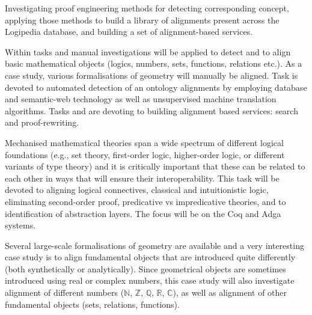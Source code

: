 \begin{workpackage}[id=alignment,type=RTD,wphases=1-48,
  short={Proof engineering},%
  title={Proof engineering},
  activity=jra,
  lead=Bel,
  LeeRM=12,  %
  StrRM=18,  %
  BelRM=20,  %
  ImtRM=6,  %
  InnRM=6,  %
  SacRM=6,  %
  FauRM=11, %
  BolRM=13, %
  InrRM=6   %
  ]

  \begin{wpobjectives}
    Investigating proof engineering
    methods for detecting corresponding concept, applying those methods
    to build a library of alignments present across the Logipedia
    database, and building a set of alignment-based services.
  \end{wpobjectives}

  \begin{wpdescription}
    Within tasks  and
     manual investigations will be
    applied to detect and to align basic mathematical objects (logics,
    numbers, sets, functions, relations etc.). As a case study,
    various formalisations of geometry will manually be aligned. Task
     is devoted to automated detection of
    an ontology alignments by employing database and semantic-web
    technology as well as unsupervised machine translation algorithms.
    Tasks  and 
    are devoting to building alignment based services: search and
    proof-rewriting.
  \end{wpdescription}

\begin{tasklist}
  \begin{task}[id=alignlogic,title=Logical foundations,shorttitle=Found.,lead=Lee,LeeRM=12,wphases=6-24!.67]
    Mechanised mathematical theories span a wide spectrum of different
    logical foundations (e.g., set theory, first-order logic,
    higher-order logic, or different variants of type theory) and it
    is critically important that these can be related to each other in
    ways that will ensure their interoperability. This task will be
    devoted to aligning logical connectives, classical and
    intuitionistic logic, eliminating second-order proof, predicative
    vs impredicative theories, and to identification of abstraction
    layers. The focus will be on the Coq and Adga systems.
  \end{task}
  
  \begin{task}[id=aligncasestudies,title=Case study: geometry,shorttitle=Cases,lead=Str,StrRM=18,BelRM=18,wphases=6-42!1]
    Several large-scale formalisations of geometry are available and a
    very interesting case study is to align fundamental objects that
    are introduced quite differently (both synthetically or
    analytically). Since geometrical objects are sometimes introduced
    using real or complex numbers, this case study will also
    investigate alignment of different numbers ($\mathbb{N}$,
    $\mathbb{Z}$, $\mathbb{Q}$, $\mathbb{R}$, $\mathbb{C}$), as well
    as alignment of other fundamental objects (sets, relations,
    functions).
  \end{task}


\end{tasklist}
\end{workpackage}
